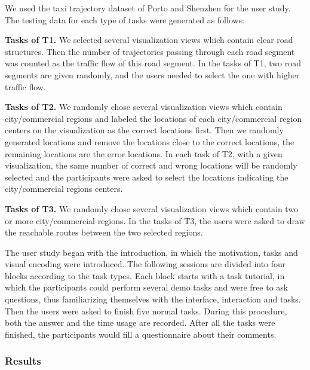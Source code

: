We used the taxi trajectory dataset of Porto and Shenzhen for the user study. The testing data for each type of tasks were generated as follows:

\textbf{Tasks of T1.} We selected several visualization views which contain clear road structures. Then the number of trajectories passing through each road segment was counted as the traffic flow of this road segment. In the tasks of T1, two road segments are given randomly, and the users needed to select the one with higher traffic flow.  

\textbf{Tasks of T2.} We randomly chose several visualization views which contain city/commercial regions and labeled the locations of each city/commercial region centers on the visualization as the correct locations first.  Then we randomly generated locations and remove the locations close to the correct locations, the remaining locations are the error locations. In each task of T2, with a given visualization, the same number of correct and wrong locations will be randomly selected and the participants were asked to select the locations indicating the city/commercial regions centers. 

\textbf{Tasks of T3.} We randomly chose several visualization views which contain two or more city/commercial regions. In the tasks of T3, the users were asked to draw the reachable routes between the two selected regions. 


The user study began with the introduction, in which the motivation, tasks and visual encoding were introduced. The following sessions are divided into four blocks according to the task types. Each block starts with a task tutorial, in which the participants could perform several demo tasks and were free to ask questions, thus familiarizing themselves with the interface, interaction and tasks.
Then the users were asked to finish five normal tasks. During this procedure, both the answer and the time usage are recorded.
After all the tasks were finished, the participants would fill a questionnaire about their comments. 

\subsubsection{Results}



